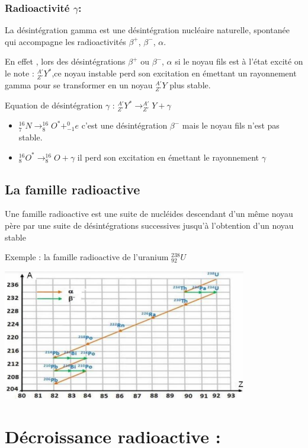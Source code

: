 \documentclass[12pt]{article}
\begin{document}
\subsubsection{ Radioactivité $\gamma$: }
La désintégration gamma est une désintégration nucléaire naturelle, spontanée qui accompagne les radioactivités $\beta^+$, $\beta^-$, $\alpha$.

En effet , lors des désintégrations $\beta^+$ ou  $\beta^-$, $\alpha$ si le noyau fils est à l'état excité on le note : $_{Z'}^{A'}Y^*$,ce noyau instable perd son excitation en émettant un rayonnement gamma pour se transformer en un noyau $_{Z'}^{A'}Y$ plus stable.



Equation de désintégration $\gamma$ : $_{Z'}^{A'}Y^* \rightarrow _{Z'}^{A'}Y + \gamma$

\begin{itemize}
	\item $_7^{16}N \rightarrow _8^{16}O^* + _{-1}^0e$ c'est une désintégration $\beta^-$ mais le noyau fils n'est pas stable. 
\item $_8^{16}O^* \rightarrow _8^{16}O + \gamma$  il perd son excitation en émettant le rayonnement $\gamma$
\end{itemize}

\subsection{La famille radioactive}
Une famille radioactive est une suite de nucléides descendant d'un même noyau père par une suite de désintégrations successives
jusqu'à l'obtention d'un noyau stable

Exemple : la famille radioactive de l'uranium $_{92}^{238}U$
\begin{center}

	\includegraphics[width=0.8\textwidth]{./img/nuc07.png}
\end{center}
\section{Décroissance radioactive : }
\end{document}
